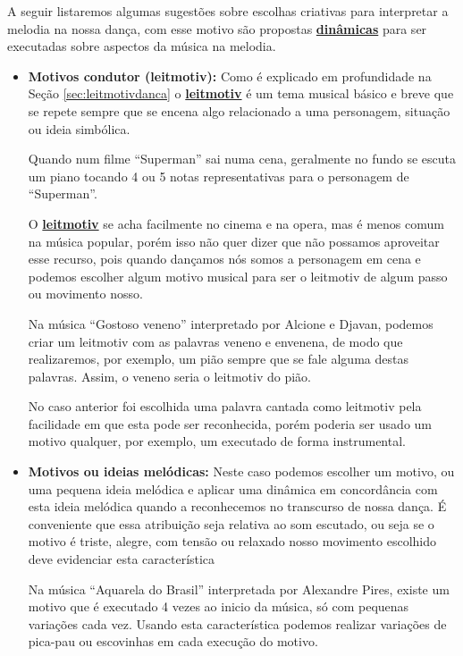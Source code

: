 A seguir listaremos algumas sugestões sobre escolhas criativas para interpretar a melodia na nossa dança,
com esse motivo são propostas \hyperref[sec:musicalidade:dinamicas]{\textbf{dinâmicas}} para ser executadas sobre aspectos da música na melodia. 
\begin{itemize}
\item \textbf{Motivos condutor (leitmotiv):} Como é explicado em profundidade na Seção \ref{sec:leitmotivdanca}
o \hyperref[sec:leitmotivdanca]{\textbf{leitmotiv}} é um tema musical básico e 
breve que se repete sempre que se encena algo relacionado a uma personagem, 
situação ou ideia simbólica.
\begin{example} Quando num filme ``Superman'' sai numa cena, geralmente no 
fundo se escuta um piano tocando 4 ou 5 notas representativas para o personagem de ``Superman''. 
\end{example}
O \hyperref[sec:leitmotivdanca]{\textbf{leitmotiv}} se acha facilmente no cinema e na opera, 
mas é menos comum na música popular, porém isso não quer dizer que não possamos aproveitar esse recurso,
pois quando dançamos nós somos a personagem em cena e podemos escolher algum motivo 
musical para ser o leitmotiv de algum passo ou movimento nosso.
\begin{example}
Na música ``Gostoso veneno'' interpretado por  Alcione e Djavan, 
podemos criar um leitmotiv com as palavras veneno e envenena,
de modo que realizaremos, por exemplo, um pião sempre que se fale alguma destas palavras.
Assim, o veneno seria o leitmotiv do pião.
\end{example}  
No caso anterior
foi escolhida uma palavra cantada como leitmotiv 
pela facilidade em que esta pode ser reconhecida, porém poderia ser usado
um motivo qualquer, por exemplo, um executado de forma instrumental.
\item \textbf{Motivos ou ideias melódicas:} Neste caso podemos escolher um motivo, 
ou uma pequena ideia melódica e aplicar uma dinâmica em concordância com esta ideia melódica
quando a reconhecemos no transcurso de nossa dança. 
É conveniente que essa atribuição seja relativa ao som escutado, ou seja 
se o motivo é triste, alegre, com tensão ou relaxado nosso movimento escolhido deve evidenciar esta característica
\begin{example}
Na música ``Aquarela do Brasil'' interpretada por Alexandre Pires, 
existe um motivo que é executado 4 vezes ao inicio da música, 
só com pequenas variações cada vez. 
Usando esta característica podemos realizar variações de pica-pau ou escovinhas em cada execução do motivo. 

\end{example}
\end{itemize}
